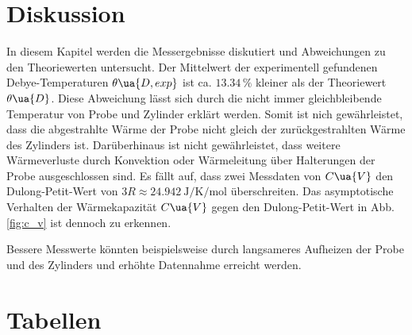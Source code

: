 \section{Diskussion}
\label{sec:diskussion}

In diesem Kapitel werden die Messergebnisse diskutiert und Abweichungen zu den Theoriewerten untersucht.
Der Mittelwert der experimentell gefundenen Debye-Temperaturen $\theta\ua{D, exp}$ ist ca.
$\num{13.34}\,\%$ kleiner als der Theoriewert $\theta\ua{D}$.
Diese Abweichung lässt sich durch die nicht immer gleichbleibende Temperatur von Probe und Zylinder
erklärt werden. Somit ist nich gewährleistet, dass die abgestrahlte Wärme der Probe nicht gleich der
zurückgestrahlten Wärme des Zylinders ist.
Darüberhinaus ist nicht gewährleistet, dass weitere Wärmeverluste durch Konvektion oder
Wärmeleitung über Halterungen der Probe ausgeschlossen sind.
Es fällt auf, dass zwei Messdaten von $C\ua{V}$ den Dulong-Petit-Wert von
$3R \approx \SI{24.942}{\joule\per\kelvin\per\mol}$ überschreiten.
Das asymptotische Verhalten der Wärmekapazität $C\ua{V}$ gegen den
Dulong-Petit-Wert in Abb. \ref{fig:c_v} ist dennoch zu erkennen. 

Bessere Messwerte könnten beispielsweise durch langsameres Aufheizen der Probe und des Zylinders und
erhöhte Datennahme erreicht werden.
\newpage
\pagestyle{empty}
\section{Tabellen}
\label{sec:tabellen}



